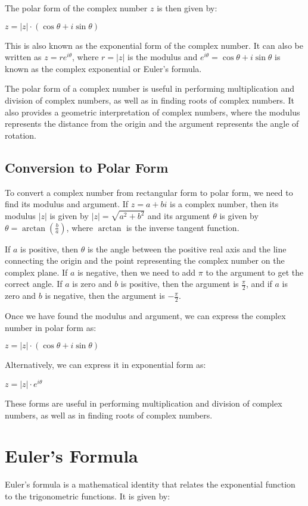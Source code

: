 \documentclass{article}
\begin{document}
The polar form of the complex number $z$ is then given by:

$z = |z| \cdot (\cos \theta + i \sin \theta)$

This is also known as the exponential form of the complex number. It can also
be written as $z = r e^{i\theta}$, where $r = |z|$ is the modulus and
$e^{i\theta} = \cos \theta + i \sin \theta$ is known as the complex exponential
or Euler's formula. 

The polar form of a complex number is useful in performing multiplication and
division of complex numbers, as well as in finding roots of complex numbers. It
also provides a geometric interpretation of complex numbers, where the modulus
represents the distance from the origin and the argument represents the angle
of rotation.


\subsection{Conversion to Polar Form}
To convert a complex number from rectangular form to polar form, we need to
find its modulus and argument. If $z = a + bi$ is a complex number, then its
modulus $|z|$ is given by $|z| = \sqrt{a^2 + b^2}$ and its argument $\theta$ is
given by $\theta = \operatorname{arctan}\left(\frac{b}{a}\right)$, where
$\operatorname{arctan}$ is the inverse tangent function.

If $a$ is positive, then $\theta$ is the angle between the positive real axis
and the line connecting the origin and the point representing the complex
number on the complex plane. If $a$ is negative, then we need to add $\pi$ to
the argument to get the correct angle. If $a$ is zero and $b$ is positive, then
the argument is $\frac{\pi}{2}$, and if $a$ is zero and $b$ is negative, then
the argument is $-\frac{\pi}{2}$.

Once we have found the modulus and argument, we can express the complex number
in polar form as:

$z = |z| \cdot (\cos \theta + i \sin \theta)$

Alternatively, we can express it in exponential form as:

$z = |z| \cdot e^{i\theta}$

These forms are useful in performing multiplication and division of complex
numbers, as well as in finding roots of complex numbers.


\section{Euler's Formula}
Euler's formula is a mathematical identity that relates the exponential
function to the trigonometric functions. It is given by:
\end{document}
